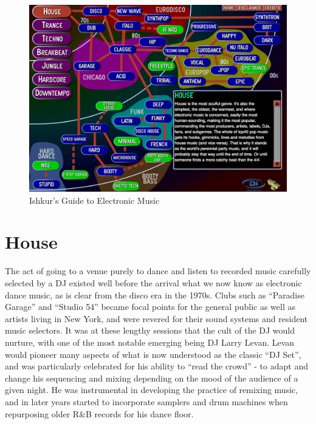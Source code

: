 \begin{figure}
	\begin{center}
		\includegraphics[width=\figSizeHundred]{ch02_dancemusic/figures/ishkur.png}
	\end{center}
	\caption[Ishkur's Guide to Electronic Music]{Ishkur's Guide to Electronic Music}
	\label{fig:ishkur}
\end{figure}

\section{House}

The act of going to a venue purely to dance and listen to recorded music carefully selected by a DJ existed well before the arrival what we now know as electronic dance music, as is clear from the disco era in the 1970s. Clubs such as “Paradise Garage” and “Studio 54” became focal points for the general public as well as artists living in New York, and were revered for their sound systems and resident music selectors. It was at these lengthy sessions that the cult of the DJ would nurture, with one of the most notable emerging being DJ Larry Levan. Levan would pioneer many aspects of what is now understood as the classic “DJ Set”, and was particularly celebrated for his ability to “read the crowd” - to adapt and change his sequencing and mixing depending on the mood of the audience of a given night. He was instrumental in developing the practice of remixing music, and in later years started to incorporate samplers and drum machines when repurposing older R\&B records for his dance floor.

